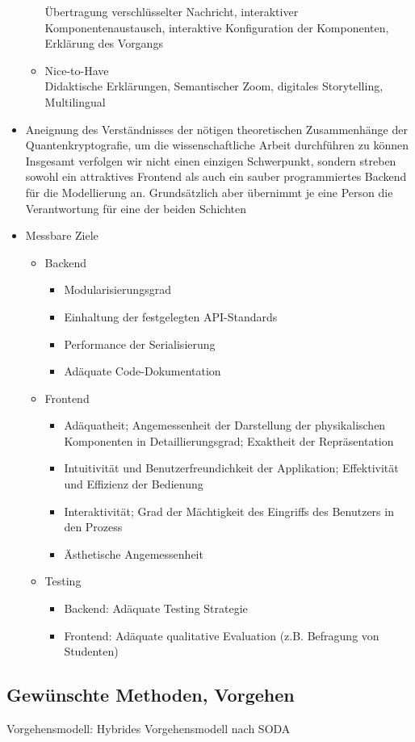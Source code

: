 \begin{itemize}
\begin{itemize}
Übertragung verschlüsselter Nachricht, interaktiver Komponentenaustausch, interaktive Konfiguration der Komponenten, Erklärung des Vorgangs
\item Nice-to-Have \\
Didaktische Erklärungen, Semantischer Zoom, digitales Storytelling, Multilingual
\end{itemize}
\item  Aneignung des Verständnisses der nötigen theoretischen Zusammenhänge der Quantenkryptografie, um die wissenschaftliche Arbeit durchführen zu können Insgesamt verfolgen wir nicht einen einzigen Schwerpunkt, sondern streben sowohl ein attraktives Frontend als auch ein sauber programmiertes Backend für die Modellierung an. Grundsätzlich aber übernimmt je eine Person die Verantwortung für eine der beiden Schichten
\item Messbare Ziele
\begin{itemize}
\item Backend
\begin{itemize}
\item Modularisierungsgrad
\item Einhaltung der festgelegten API-Standards
\item Performance der Serialisierung
\item Adäquate Code-Dokumentation
\end{itemize}
\item Frontend
\begin{itemize}
\item  Adäquatheit; Angemessenheit der Darstellung der physikalischen Komponenten in Detaillierungsgrad; Exaktheit der Repräsentation
\item Intuitivität und Benutzerfreundichkeit der Applikation; Effektivität und Effizienz der Bedienung
\item Interaktivität; Grad der Mächtigkeit des Eingriffs des Benutzers in den Prozess
\item Ästhetische Angemessenheit
\end{itemize}
\item Testing 
\begin{itemize}
\item Backend: Adäquate Testing Strategie 
\item Frontend: Adäquate qualitative Evaluation (z.B. Befragung von Studenten)
\end{itemize}
\end{itemize}
\end{itemize}
\subsection{Gewünschte Methoden, Vorgehen}
Vorgehensmodell: Hybrides Vorgehensmodell nach SODA

